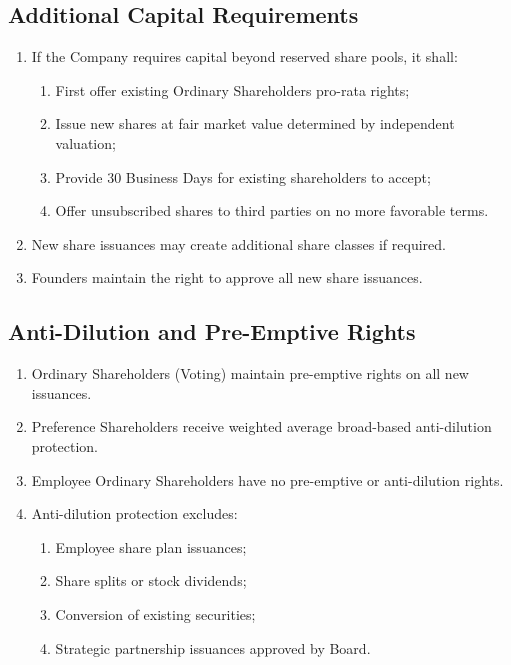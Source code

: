 \subsection{Additional Capital Requirements}
\begin{enumerate}[label=(\alph*)]
\item If the Company requires capital beyond reserved share pools, it shall:
    \begin{enumerate}[label=(\roman*)]
    \item First offer existing Ordinary Shareholders pro-rata rights;
    \item Issue new shares at fair market value determined by independent valuation;
    \item Provide 30 Business Days for existing shareholders to accept;
    \item Offer unsubscribed shares to third parties on no more favorable terms.
    \end{enumerate}
\item New share issuances may create additional share classes if required.
\item Founders maintain the right to approve all new share issuances.
\end{enumerate}

\subsection{Anti-Dilution and Pre-Emptive Rights}
\begin{enumerate}[label=(\alph*)]
\item Ordinary Shareholders (Voting) maintain pre-emptive rights on all new issuances.
\item Preference Shareholders receive weighted average broad-based anti-dilution protection.
\item Employee Ordinary Shareholders have no pre-emptive or anti-dilution rights.
\item Anti-dilution protection excludes:
    \begin{enumerate}[label=(\roman*)]
    \item Employee share plan issuances;
    \item Share splits or stock dividends;
    \item Conversion of existing securities;
    \item Strategic partnership issuances approved by Board.
    \end{enumerate}
\end{enumerate}

